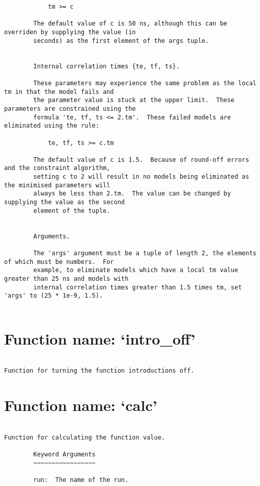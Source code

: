 \begin{verbatim}
            tm >= c

        The default value of c is 50 ns, although this can be overriden by supplying the value (in
        seconds) as the first element of the args tuple.


        Internal correlation times {te, tf, ts}.

        These parameters may experience the same problem as the local tm in that the model fails and
        the parameter value is stuck at the upper limit.  These parameters are constrained using the
        formula 'te, tf, ts <= 2.tm'.  These failed models are eliminated using the rule:

            te, tf, ts >= c.tm

        The default value of c is 1.5.  Because of round-off errors and the constraint algorithm,
        setting c to 2 will result in no models being eliminated as the minimised parameters will
        always be less than 2.tm.  The value can be changed by supplying the value as the second
        element of the tuple.


        Arguments.

        The 'args' argument must be a tuple of length 2, the elements of which must be numbers.  For
        example, to eliminate models which have a local tm value greater than 25 ns and models with
        internal correlation times greater than 1.5 times tm, set 'args' to (25 * 1e-9, 1.5).
        

\end{verbatim}

\normalsize
\section{Function name: `intro\_off'}

\scriptsize
\begin{verbatim}

Function for turning the function introductions off.
\end{verbatim}

\normalsize
\section{Function name: `calc'}

\scriptsize
\begin{verbatim}

Function for calculating the function value.

        Keyword Arguments
        ~~~~~~~~~~~~~~~~~

        run:  The name of the run.
        
\end{verbatim}

